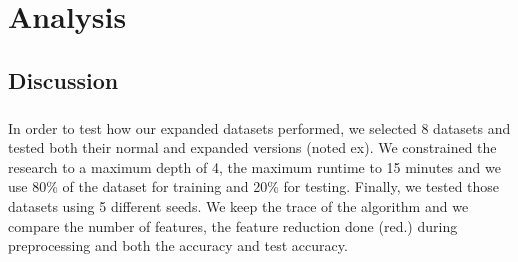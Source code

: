 \documentclass[12pt]{report}
\theoremstyle{definition}
\theoremstyle{definition}
\theoremstyle{definition}
\begin{document}
\chapter{Analysis}
\section{Discussion}
\paragraph{} In order to test how our expanded datasets performed, we selected 8 datasets and tested both their normal
and expanded versions (noted ex). We constrained the research to a maximum depth of 4, the maximum runtime to 15 minutes
and we use 80\% of the dataset for training and 20\% for testing. Finally, we tested those datasets using 5 different
seeds. We keep the trace of the algorithm and we compare the number of features, the feature reduction done (red.) during
preprocessing and both the accuracy and test accuracy.
\end{document}
